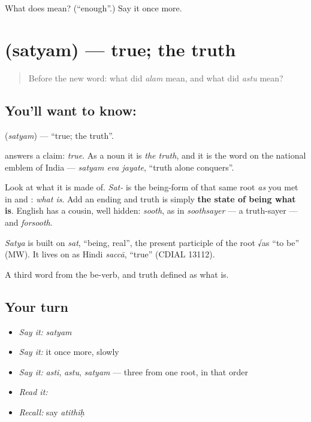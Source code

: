 \begin{tcolorbox}[breakable,colback=teal!4,colframe=teal!35!black,title={Before you move on}]
What does  mean? (\textquotedblleft{}enough\textquotedblright{}.) Say it once more.
\end{tcolorbox}
\section[\texorpdfstring{\sk{सत्यम्} (satyam)}{सत्यम् (satyam)}]{ (satyam) — true; the truth}

\label{lesson:SA-C27-true}



\begin{quote}
Before the new word: what did \emph{alam} mean, and what did \emph{astu} mean?
\end{quote}

\subsection*{You'll want to know: }
\textbf{} (\emph{satyam}) — \textquotedblleft{}true; the truth\textquotedblright{}.

\textbf{} answers a claim: \emph{true}. As a noun it is \emph{the truth}, and it is the word on the national emblem of India — \emph{satyam eva jayate}, \textquotedblleft{}truth alone conquers\textquotedblright{}.

Look at what it is made of. \emph{Sat-} is the being-form of that same root \emph{as} you met in  and : \emph{what is}. Add an ending and truth is simply \textbf{the state of being what is}. English has a cousin, well hidden: \emph{sooth}, as in \emph{soothsayer} — a truth-sayer — and \emph{forsooth}.

\begin{cousinweb}
\emph{Satya} is built on \emph{sat}, \textquotedblleft{}being, real\textquotedblright{}, the present participle of the root √as \textquotedblleft{}to be\textquotedblright{} (MW). It lives on as Hindi \emph{saccā}, \textquotedblleft{}true\textquotedblright{} (CDIAL 13112).
\end{cousinweb}

\begin{grammarlens}[title={What you've built}]
A third word from the be-verb, and truth defined as what is.
\end{grammarlens}

\subsection*{Your turn}
\begin{itemize}
\raggedright
  \item \emph{Say it:} \emph{satyam}
  \item \emph{Say it:} it once more, slowly
  \item \emph{Say it:} \emph{asti}, \emph{astu}, \emph{satyam} — three from one root, in that order
  \item \emph{Read it:} \textbf{}
  \item \emph{Recall:} say \emph{atithiḥ}
\end{itemize}

